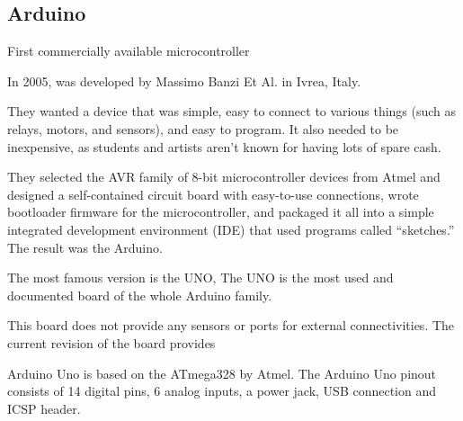 	\subsection{Arduino}
	
		
		First commercially available microcontroller
		
		
		In 2005, 
		was developed by Massimo Banzi Et Al. in Ivrea, Italy.
		
		They wanted a device that was simple, easy to connect to various things (such as relays, motors, and sensors), and easy to program. It also needed to be inexpensive, as students and artists aren’t known for having lots of spare cash. 
		
		They selected the AVR family of 8-bit microcontroller devices from Atmel and designed a self-contained circuit board with easy-to-use connections, wrote bootloader firmware for the microcontroller, and packaged it all into a simple integrated development environment (IDE) that used programs called “sketches.” The result was the Arduino.
		
		
		The most famous version is the UNO, The UNO is the most used and documented board of the whole Arduino family.
		
		This board does not provide any sensors or ports for external connectivities.
		The current revision of the board provides 
		
		Arduino Uno is based on the ATmega328﻿ by Atmel. The Arduino Uno pinout consists of 14 digital pins, 6 analog inputs, a power jack, USB connection and ICSP header. 
		
		
